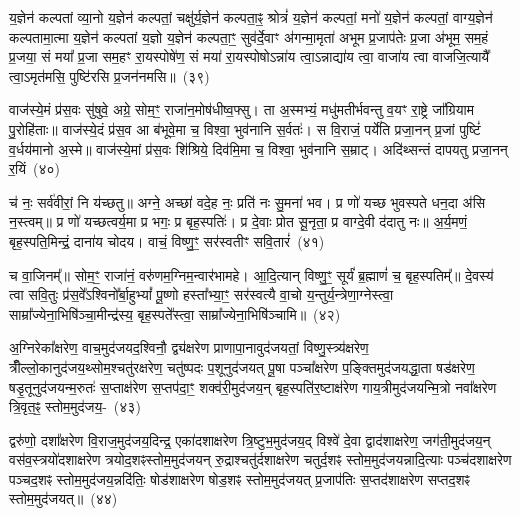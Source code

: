 य॒ज्ञेन॑ कल्पतां व्या॒नो य॒ज्ञेन॑ कल्पतां॒ चक्षु॑र्य॒ज्ञेन॑ कल्पता॒ꣴ॒ श्रोत्रं॑ य॒ज्ञेन॑ कल्पतां॒ मनो॑ य॒ज्ञेन॑ कल्पतां॒ वाग्य॒ज्ञेन॑ कल्पतामा॒त्मा य॒ज्ञेन॑ कल्पतां य॒ज्ञो य॒ज्ञेन॑ कल्पता॒ꣳ॒ सुव॑र्दे॒वाꣳ अ॑गन्मा॒मृता॑ अभूम प्र॒जा\-प॑तेः प्र॒जा अ॑भूम॒ सम॒हं प्र॒जया॒ सं मया᳚ प्र॒जा सम॒हꣳ रा॒यस्पोषे॑ण॒ सं मया॑ रा॒यस्पोषो\-ऽन्ना॑य त्वा॒\-ऽन्नाद्या॑य त्वा॒ वाजा॑य त्वा वाजजि॒त्यायै᳚ त्वा॒\-ऽमृत॑मसि॒ पुष्टि॑रसि प्र॒जन॑नमसि॥~(३९)\ip

{\anuvakamend[{अ॒पा॒नो वाजा॑य॒ नव॑ च}]}

वाज॑स्ये॒मं प्र॑स॒वः सु॑षुवे॒ अग्रे॒ सोम॒ꣳ॒ राजा॑न॒मोष॑धीष्व॒फ्सु। ता अ॒स्मभ्यं॒ मधु॑मतीर्भवन्तु व॒यꣳ रा॒ष्ट्रे जा᳚ग्रियाम पु॒रोहि॑ताः॥ वाज॑स्ये॒दं प्र॑स॒व आ ब॑भूवे॒मा च॒ विश्वा॒ भुव॑नानि स॒र्वतः॑। स वि॒राजं॒ पर्ये॑ति प्रजा॒नन् प्र॒जां पुष्टिं॑ व॒र्धय॑मानो अ॒स्मे॥ वाज॑स्ये॒मां प्र॑स॒वः शि॑श्रिये॒ दिव॑मि॒मा च॒ विश्वा॒ भुव॑नानि स॒म्राट्। अदि॑थ्सन्तं दापयतु प्रजा॒नन् र॒यिं~(४०)\ip

च॑ नः॒ सर्व॑वीरां॒ नि य॑च्छतु॥ अग्ने॒ अच्छा॑ वदे॒ह नः॒ प्रति॑ नः सु॒मना॑ भव। प्र णो॑ यच्छ भुवस्पते धन॒दा अ॑सि न॒स्त्वम्॥ प्र णो॑ यच्छत्वर्य॒मा प्र भगः॒ प्र बृह॒स्पतिः॑। प्र दे॒वाः प्रोत सू॒नृता॒ प्र वाग्दे॒वी द॑दातु नः॥ अ॒र्य॒मणं॒ बृह॒स्पति॒मिन्द्रं॒ दाना॑य चोदय। वाचं॒ विष्णु॒ꣳ॒ सर॑स्वतीꣳ सवि॒तारं॑~(४१)\ip

च वा॒जिनम्᳚॥ सोम॒ꣳ॒ राजा॑नं॒ वरु॑णम॒ग्निम॒न्वार॑भामहे। आ॒दि॒त्यान् विष्णु॒ꣳ॒ सूर्यं॑ ब्र॒ह्माणं॑ च॒ बृह॒स्पतिम्᳚॥ दे॒वस्य॑ त्वा सवि॒तुः प्र॑स॒वे᳚\-ऽश्विनो᳚र्बा॒हु\-भ्यां᳚ पू॒ष्णो हस्ता᳚भ्या॒ꣳ॒ सर॑स्वत्यै वा॒चो य॒न्तुर्य॒न्त्रेणा॒ग्नेस्त्वा॒ साम्रा᳚ज्येना॒भिषि॑ञ्चा॒मीन्द्र॑स्य॒ बृह॒स्पते᳚स्त्वा॒ साम्रा᳚ज्येना॒भिषि॑ञ्चामि॥~(४२)\ip

{\anuvakamend[{र॒यिꣳ स॑वि॒तार॒ꣳ॒ षट्त्रिꣳ॑शच्च}]}%

अ॒ग्निरेका᳚क्षरेण॒ वाच॒मुद॑जयद॒श्विनौ॒ द्व्य॑क्षरेण प्राणा\-पा॒ना\-वुद॑\-जयतां॒ विष्णु॒स्त्र्य॑क्षरेण॒ त्रीँल्लो॒कानुद॑जय॒थ्सोम॒श्चतु॑रक्षरेण॒ चतु॑ष्पदः प॒शूनुद॑जयत् पू॒षा पञ्चा᳚क्षरेण प॒ङ्क्तिमुद॑जयद्धा॒ता षड॑क्षरेण॒ षडृ॒तूनुद॑जयन्म॒रुतः॑ स॒प्ताक्ष॑रेण स॒प्तप॑दा॒ꣳ॒ शक्व॑री॒मुद॑जय॒न् बृह॒स्पति॑र॒ष्टाक्ष॑रेण गाय॒त्रीमुद॑जयन्मि॒त्रो नवा᳚क्षरेण त्रि॒वृत॒ꣴ॒ स्तोम॒मुद॑जय॒-~(४३)\ip

द्वरु॑णो॒ दशा᳚क्षरेण वि॒राज॒मुद॑जय॒दिन्द्र॒ एका॑\-दशा\-क्षरेण त्रि॒ष्टुभ॒मुद॑जय॒द् विश्वे॑ दे॒वा द्वाद॑शाक्षरेण॒ जग॑ती॒मुद॑जय॒न् वस॑व॒स्त्रयो॑\-दशा\-क्षरेण त्रयोद॒शꣴस्तोम॒मुद॑जयन् रु॒द्राश्चतु॑र्दशा\-क्षरेण चतुर्द॒शꣴ स्तोम॒मुद॑जयन्नादि॒त्याः पञ्च॑\-दशा\-क्षरेण पञ्चद॒शꣴ स्तोम॒मुद॑जय॒न्नदि॑तिः॒ षोड॑शाक्षरेण षोड॒शꣴ स्तोम॒मुद॑जयत् प्र॒जा\-प॑तिः स॒प्तद॑शाक्षरेण सप्तद॒शꣴ स्तोम॒मुद॑जयत्॥~(४४)\ip


